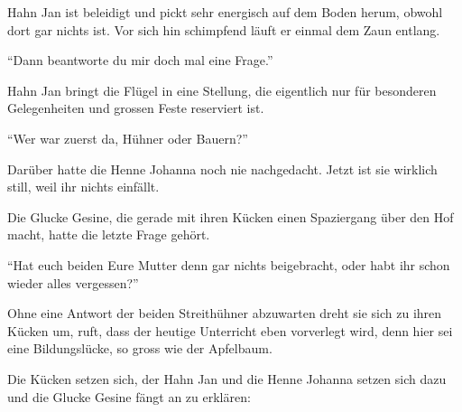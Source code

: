 Hahn Jan ist beleidigt und pickt sehr energisch auf dem Boden herum, obwohl
dort gar nichts ist. Vor sich hin schimpfend läuft er einmal dem Zaun entlang.


\enquote{Dann beantworte du mir doch mal eine Frage.}

Hahn Jan bringt die Flügel in eine Stellung, die eigentlich nur für
besonderen Gelegenheiten und grossen Feste reserviert ist.


\enquote{Wer war zuerst da, Hühner oder Bauern?}

Darüber hatte die Henne Johanna noch nie nachgedacht. Jetzt ist sie wirklich
still, weil ihr nichts einfällt. 

Die Glucke Gesine, die gerade mit ihren Kücken einen Spaziergang über den Hof
macht, hatte die letzte Frage gehört.

\enquote{Hat euch beiden Eure Mutter denn gar nichts beigebracht, oder habt ihr
schon wieder alles vergessen?}

Ohne eine Antwort der beiden Streithühner abzuwarten dreht sie sich zu ihren
Kücken um, ruft, dass der heutige Unterricht eben vorverlegt wird, denn hier
sei eine Bildungslücke, so gross wie der Apfelbaum. 

Die Kücken setzen sich, der Hahn Jan und die Henne Johanna setzen sich dazu und
die Glucke Gesine fängt an zu erklären:

